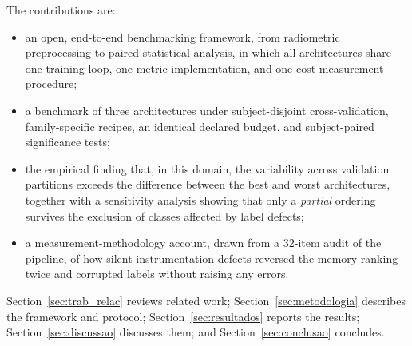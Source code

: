 The contributions are:
\begin{itemize}
\item an open, end-to-end benchmarking framework, from radiometric preprocessing to paired statistical analysis, in which all architectures share one training loop, one metric implementation, and one cost-measurement procedure;
\item a benchmark of three architectures under subject-disjoint cross-validation, family-specific recipes, an identical declared budget, and subject-paired significance tests;
\item the empirical finding that, in this domain, the variability across validation partitions exceeds the difference between the best and worst architectures, together with a sensitivity analysis showing that only a \emph{partial} ordering survives the exclusion of classes affected by label defects;
\item a measurement-methodology account, drawn from a 32-item audit of the pipeline, of how silent instrumentation defects reversed the memory ranking twice and corrupted labels without raising any errors.
\end{itemize}

Section~\ref{sec:trab_relac} reviews related work; Section~\ref{sec:metodologia} describes the framework and protocol; Section~\ref{sec:resultados} reports the results; Section~\ref{sec:discussao} discusses them; and Section~\ref{sec:conclusao} concludes. 